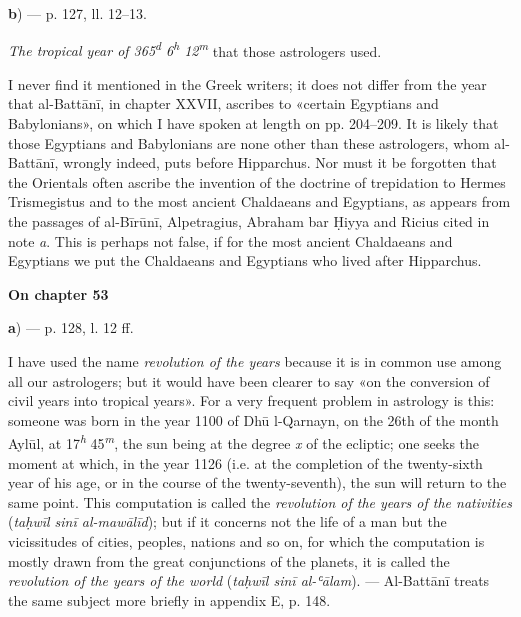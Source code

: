 \documentclass[11pt]{article}
\newcommand{\UnitHead}[2]{\par\setcounter{footnoteT}{0}\needspace{8\baselineskip}\bigskip\pdfbookmark[1]{#1}{unit-#2}\hypertarget{EN-#2}{}%
 {\large\bfseries\interlinepenalty=10000 #1\par}\nobreak\medskip}
\begin{document}
\par\begin{center}\textbf{b}) — p. 127, ll. 12–13.\end{center}
\par \emph{The tropical year of 365\textsuperscript{\itshape d} 6\textsuperscript{\itshape h} 12\textsuperscript{\itshape m}} that those astrologers used.\par
\par I never find it mentioned in the Greek writers; it does not differ from the year that al-Battānī, in chapter XXVII, ascribes to «certain Egyptians and Babylonians», on which I have spoken at length on pp. 204–209. It is likely that those Egyptians and Babylonians are none other than these astrologers, whom al-Battānī, wrongly indeed, puts before Hipparchus. Nor must it be forgotten that the Orientals often ascribe the invention of the doctrine of trepidation to Hermes Trismegistus and to the most ancient Chaldaeans and Egyptians, as appears from the passages of al-Bīrūnī, Alpetragius, Abraham bar Ḥiyya and Ricius cited in note \emph{a}. This is perhaps not false, if for the most ancient Chaldaeans and Egyptians we put the Chaldaeans and Egyptians who lived after Hipparchus.\par
\UnitHead{On chapter 53}{A53}
\par\begin{center}\textbf{a}) — p. 128, l. 12 ff.\end{center}
\par I have used the name \emph{revolution of the years} because it is in common use among all our astrologers; but it would have been clearer to say «on the conversion of civil years into tropical years». For a very frequent problem in astrology is this: someone was born in the year 1100 of Dhū l-Qarnayn, on the 26th of the month Aylūl, at 17\textsuperscript{\itshape h} 45\textsuperscript{\itshape m}, the sun being at the degree \emph{x} of the ecliptic; one seeks the moment at which, in the year 1126 (i.e. at the completion of the twenty-sixth year of his age, or in the course of the twenty-seventh), the sun will return to the same point. This computation is called the \emph{revolution of the years of the nativities} (\emph{taḥwīl sinī al-mawālīd}); but if it concerns not the life of a man but the vicissitudes of cities, peoples, nations and so on, for which the computation is mostly drawn from the great conjunctions of the planets, it is called the \emph{revolution of the years of the world} (\emph{taḥwīl sinī al-ʿālam}). — Al-Battānī treats the same subject more briefly in appendix E, p. 148.\par
\end{document}
